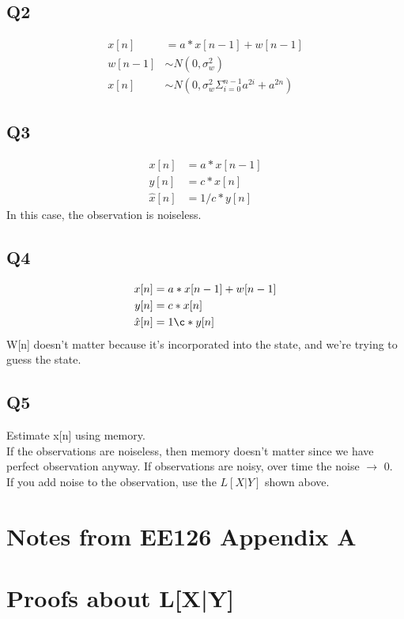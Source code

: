 \documentclass[leqno,twocolumn]{article}
\begin{document}
\subsection{Q2}
\begin{align*}
x[n] &= a*x[n-1] + w[n-1]\\
w[n-1] &\sim N(0,\sigma_w^2)\\
x[n] &\sim N(0, \sigma_w^2\Sigma_{i=0}^{n-1}a^{2i} + a^{2n})
\end{align*}

\subsection{Q3}
\begin{align*}
x[n] &= a*x[n-1]\\
y[n] &= c*x[n]\\
\hat{x}[n] &= 1/c*y[n]
\end{align*}
In this case, the observation is noiseless.

\subsection{Q4}
\begin{align*}
x[n] &= a*x[n-1]+w[n-1]\\
y[n] &= c*x[n]\\
\hat{x}[n] &= 1\c*y[n]
\end{align*}
W[n] doesn't matter because it's incorporated into the state, and we're trying to guess the state.

\subsection{Q5}
Estimate x[n] using memory.\\
If the observations are noiseless, then memory doesn't matter since we have perfect observation anyway. If observations are noisy, over time the noise $\rightarrow$ 0.\\

If you add noise to the observation, use the $L[X|Y]$ shown above.

\section{Notes from EE126 Appendix A}

\section{Proofs about L[X|Y]}
\end{document}
